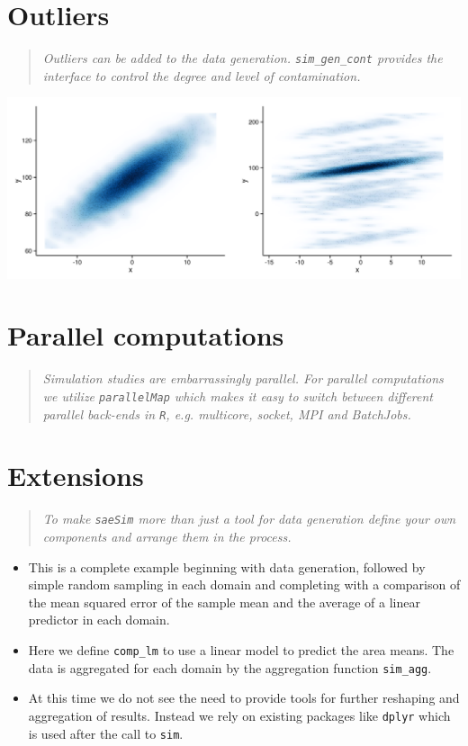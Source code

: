 \documentclass[a0,portrait]{a0poster}\usepackage[]{graphicx}\usepackage[]{color}
\newcommand{\mysec}[1]{\color{Black}\section*{#1}\color{DarkSlateGray}}
\newcommand{\code}[1]{\texttt{#1}}
\newcommand{\inputR}[1]{}
\begin{document}
\begin{multicols}{2}
\mysec{Outliers}

\begin{verse}
\textit{Outliers can be added to the data generation. \texttt{sim\_gen\_cont} provides the interface to control the degree and level of contamination.}
\end{verse}

\inputR{Rmd/outliers}
\includegraphics[width=\linewidth]{figs/outliers/outliers-1}

\columnbreak

\mysec{Parallel computations}

\begin{verse}
\textit{Simulation studies are embarrassingly parallel. For parallel computations we utilize \code{parallelMap} which makes it easy to switch between different parallel back-ends in \code{R}, e.g. multicore, socket, MPI and BatchJobs.}
\end{verse}

\inputR{Rmd/parallelComputations}


\mysec{Extensions}

\begin{verse}
\textit{To make \texttt{saeSim} more than just a tool for data generation define your own components and arrange them in the process.}
\end{verse}

\begin{itemize}
  \item This is a complete example beginning with data generation, followed by simple random sampling in each domain and completing with a comparison of the mean squared error of the sample mean and the average of a linear predictor in each domain.
  \item Here we define \texttt{comp\_lm} to use a linear model to predict the area means. The data is aggregated for each domain by the aggregation function \texttt{sim\_agg}.
  \item At this time we do not see the need to provide tools for further reshaping and aggregation of results. Instead we rely on existing packages like \texttt{dplyr} which is used after the call to \texttt{sim}.
\end{itemize}


\end{multicols}
\end{document}
